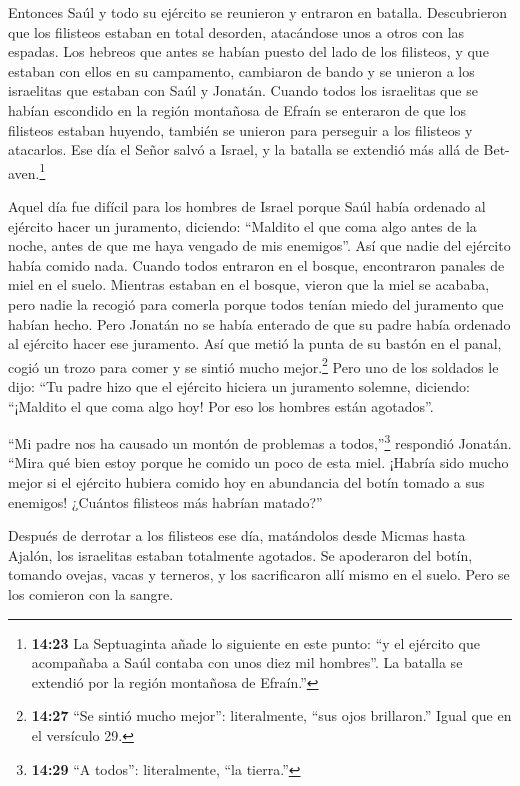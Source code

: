  Entonces Saúl y todo su ejército se reunieron y entraron
en batalla. Descubrieron que los filisteos estaban en total desorden,
atacándose unos a otros con las espadas.  Los hebreos que
antes se habían puesto del lado de los filisteos, y que estaban con
ellos en su campamento, cambiaron de bando y se unieron a los israelitas
que estaban con Saúl y Jonatán.  Cuando todos los
israelitas que se habían escondido en la región montañosa de Efraín se
enteraron de que los filisteos estaban huyendo, también se unieron para
perseguir a los filisteos y atacarlos.  Ese día el Señor
salvó a Israel, y la batalla se extendió más allá de
Bet-aven.\footnote{\textbf{14:23} La Septuaginta añade lo siguiente en
  este punto: ``y el ejército que acompañaba a Saúl contaba con unos
  diez mil hombres''. La batalla se extendió por la región montañosa de
  Efraín.''}

 Aquel día fue difícil para los hombres de Israel porque
Saúl había ordenado al ejército hacer un juramento, diciendo: ``Maldito
el que coma algo antes de la noche, antes de que me haya vengado de mis
enemigos''. Así que nadie del ejército había comido nada. 
Cuando todos entraron en el bosque, encontraron panales de miel en el
suelo.  Mientras estaban en el bosque, vieron que la miel
se acababa, pero nadie la recogió para comerla porque todos tenían miedo
del juramento que habían hecho.  Pero Jonatán no se había
enterado de que su padre había ordenado al ejército hacer ese juramento.
Así que metió la punta de su bastón en el panal, cogió un trozo para
comer y se sintió mucho mejor.\footnote{\textbf{14:27} ``Se sintió mucho
  mejor'': literalmente, ``sus ojos brillaron.'' Igual que en el
  versículo 29.}  Pero uno de los soldados le dijo: ``Tu
padre hizo que el ejército hiciera un juramento solemne, diciendo:
``¡Maldito el que coma algo hoy! Por eso los hombres están agotados''.

 ``Mi padre nos ha causado un montón de problemas a
todos,''\footnote{\textbf{14:29} ``A todos'': literalmente, ``la
  tierra.''} respondió Jonatán. ``Mira qué bien estoy porque he comido
un poco de esta miel.  ¡Habría sido mucho mejor si el
ejército hubiera comido hoy en abundancia del botín tomado a sus
enemigos! ¿Cuántos filisteos más habrían matado?''

 Después de derrotar a los filisteos ese día, matándolos
desde Micmas hasta Ajalón, los israelitas estaban totalmente agotados.
 Se apoderaron del botín, tomando ovejas, vacas y terneros,
y los sacrificaron allí mismo en el suelo. Pero se los comieron con la
sangre.

